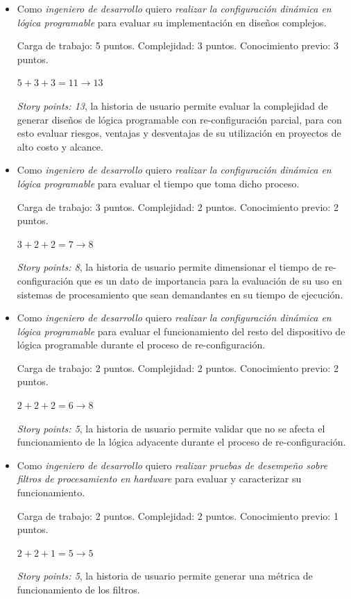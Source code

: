 \documentclass[
11pt, %
]{charter}
\begin{document}
\begin{itemize}
	\item Como \emph{ingeniero de desarrollo} quiero \emph{realizar la configuración dinámica en lógica programable} para evaluar su implementación en diseños complejos.
	
	Carga de trabajo: 5 puntos.
	Complejidad: 3 puntos.
	Conocimiento previo: 3 puntos.
	\begin{center}
		$ 5 + 3 + 3 = 11 \rightarrow 13 $
	\end{center}
	 
	\emph{Story points: 13}, la historia de usuario permite evaluar la complejidad de generar diseños de lógica programable con re-configuración parcial, para con esto evaluar riesgos, ventajas y desventajas de su utilización en proyectos de alto costo y alcance.	
	
	\item Como \emph{ingeniero de desarrollo} quiero \emph{realizar la configuración dinámica en lógica programable} para evaluar el tiempo que toma dicho proceso.

	Carga de trabajo: 3 puntos.
	Complejidad: 2 puntos.
	Conocimiento previo: 2 puntos.
	\begin{center}
		$ 3 + 2 + 2 = 7 \rightarrow 8 $
	\end{center}
	
	\emph{Story points: 8}, la historia de usuario permite dimensionar el tiempo de re-configuración que es un dato de importancia para la evaluación de su uso en sistemas de procesamiento que sean demandantes en su tiempo de ejecución.

	\item Como \emph{ingeniero de desarrollo} quiero \emph{realizar la configuración dinámica en lógica programable} para evaluar el funcionamiento del resto del dispositivo de lógica programable durante el proceso de re-configuración. 
			
	Carga de trabajo: 2 puntos.
	Complejidad: 2 puntos.
	Conocimiento previo: 2 puntos.
	\begin{center}
		$ 2 + 2 + 2 = 6 \rightarrow 8 $
	\end{center}
	
	\emph{Story points: 5}, la historia de usuario permite validar que no se afecta el funcionamiento de la lógica adyacente durante el proceso de re-configuración.

	\item Como \emph{ingeniero de desarrollo} quiero \emph{realizar pruebas de desempeño sobre filtros de procesamiento en hardware} para evaluar y caracterizar su funcionamiento.
			
	Carga de trabajo: 2 puntos.
	Complejidad: 2 puntos.
	Conocimiento previo: 1 puntos.
	\begin{center}
		$ 2 + 2 + 1 = 5 \rightarrow 5 $
	\end{center}

	\emph{Story points: 5}, la historia de usuario permite generar una métrica de funcionamiento de los filtros.

\end{itemize}	
\end{document}
